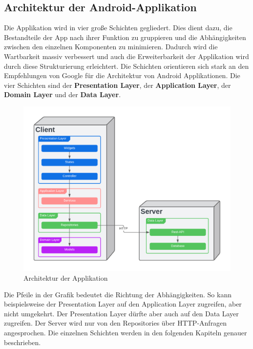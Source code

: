 \documentclass{entwurfsheft}
\begin{document}
\begin{sloppypar}
\subsection{Architektur der Android-Applikation}


Die Applikation wird in vier große Schichten gegliedert. Dies dient dazu, die Bestandteile der App nach ihrer Funktion zu gruppieren und die Abhängigkeiten zwischen den einzelnen Komponenten zu minimieren. Dadurch wird die Wartbarkeit massiv verbessert und auch die Erweiterbarkeit der Applikation wird durch diese Strukturierung erleichtert. Die Schichten orientieren sich stark an den Empfehlungen von Google für die Architektur von Android Applikationen. Die vier Schichten sind der \textbf{Presentation Layer}, der \textbf{Application Layer}, der \textbf{Domain Layer} und der \textbf{Data Layer}.
\begin{figure}[htp]
    \centering
    \includegraphics[height = 0.4\textheight]{images/architecture/architecture.pdf}
    \caption{Architektur der Applikation}
    \label{fig:struktur}
\end{figure}

Die Pfeile in der Grafik bedeutet die Richtung der Abhängigkeiten. So kann beispielsweise der Presentation Layer auf den Application Layer zugreifen, aber nicht umgekehrt. Der Presentation Layer dürfte aber auch auf den Data Layer zugreifen. Der Server wird nur von den Repositories über HTTP-Anfragen angesprochen.
Die einzelnen Schichten werden in den folgenden Kapiteln genauer beschrieben.
\newpage


\end{sloppypar}
\end{document}
